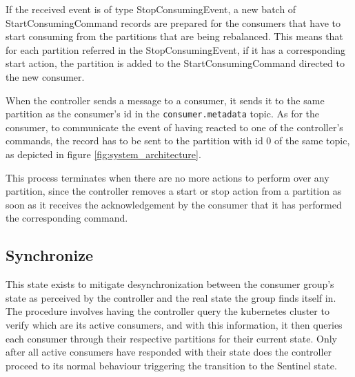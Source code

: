 If the received event is of type StopConsumingEvent, a new batch of
StartConsumingCommand records are prepared for the consumers that have to start
consuming from the partitions that are being rebalanced. This means that for
each partition referred in the StopConsumingEvent, if it has a corresponding
start action, the partition is added to the StartConsumingCommand directed to
the new consumer. 

When the controller sends a message to a consumer, it sends it to the same
partition as the consumer's id in the \lstinline{consumer.metadata} topic. As for
the consumer, to communicate the event of having reacted to one of the
controller's commands, the record has to be sent to the partition with id $0$ of
the same topic, as depicted in figure \ref{fig:system_architecture}.

This process terminates when there are no more actions to perform over any
partition, since the controller removes a start or stop action from a partition
as soon as it receives the acknowledgement by the consumer that it has performed
the corresponding command.

\subsection{Synchronize}

This state exists to mitigate desynchronization between the consumer group's
state as perceived by the controller and the real state the group finds itself
in. The procedure involves having the controller query the kubernetes cluster to
verify which are its active consumers, and with this information, it then
queries each consumer through their respective partitions for their current
state.  Only after all active consumers have responded with their state does the
controller proceed to its normal behaviour triggering the transition to the
Sentinel state. 
